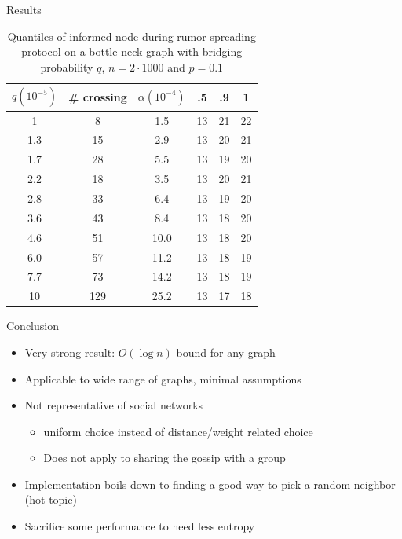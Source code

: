 \documentclass{beamer}
\begin{document}
\begin{frame}{Results}
  \begin{table}
\centering
\begin{tabular}{c|c|c||c|c|c}
  $q (10^{-5})$ & \# crossing & $\alpha (10^{-4})$ & .5 & .9 & 1\\
  \hline
  1 & 8 & 1.5 & 13 & 21 & 22 \\
1.3 & 15 & 2.9 & 13 & 20 & 21 \\
1.7 & 28 & 5.5 & 13 & 19 & 20 \\
2.2 & 18 & 3.5 & 13 & 20 & 21 \\
2.8 & 33 & 6.4 & 13 & 19 & 20 \\
3.6 & 43 & 8.4 & 13 & 18 & 20 \\
4.6 & 51 & 10.0 & 13 & 18 & 20 \\
6.0 & 57 & 11.2 & 13 & 18 & 19 \\
7.7 & 73 & 14.2 & 13 & 18 & 19 \\
10 & 129 & 25.2 & 13 & 17 & 18 \\
\end{tabular}
\caption{Quantiles of informed node during rumor spreading protocol on a bottle neck graph with bridging probability $q$, $n = 2 \cdot 1000$ and $p = 0.1$}
\label{tab:quantiles}
\end{table}
\end{frame}

\begin{frame}{Conclusion}

\begin{itemize}
  \item Very strong result: $O(\log n)$ bound for any graph
  \item Applicable to wide range of graphs, minimal assumptions
  \item Not representative of social networks
  \begin{itemize}
    \item uniform choice instead of distance/weight related choice
    \item Does not apply to sharing the gossip with a group
  \end{itemize}
  \item Implementation boils down to finding a good way to pick a random neighbor (hot topic)
  \item Sacrifice some performance to need less entropy
\end{itemize}
  
\end{frame}
\end{document}
